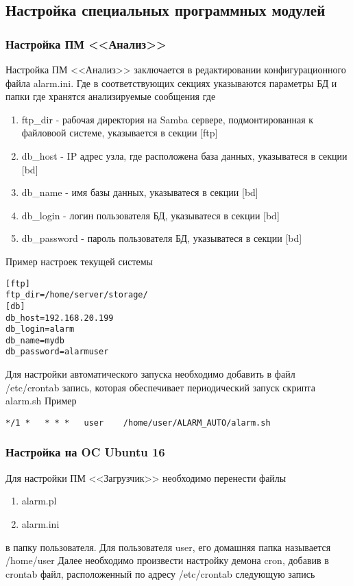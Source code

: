 ﻿\documentclass[12pt]{article}[a4paper,14pt,russian]
\begin{document}
	\subsection {Настройка специальных программных модулей}
	\subsubsection{Настройка ПМ <<Анализ>>}
	Настройка ПМ <<Анализ>> заключается в редактировании конфигурационного файла alarm.ini. Где в соответствующих секциях указываются параметры БД и папки где хранятся анализируемые сообщения 
	где
	\begin{enumerate}
		\item ftp\_dir - рабочая директория на Samba сервере, подмонтированная
		 к файловоой системе, указывается в секции [ftp]
		 \item db\_host - IP адрес узла, где расположена база данных, указыватеся в секции [bd]
		 \item db\_name - имя базы данных, указыватеся в секции [bd]
		 \item db\_login - логин пользователя БД, указыватеся в секции [bd]
		 \item db\_password - пароль пользователя БД, указыватеся в секции [bd]
	\end{enumerate}
	
	Пример настроек текущей системы
\begin{verbatim} 
[ftp]
ftp_dir=/home/server/storage/
[db]
db_host=192.168.20.199
db_login=alarm
db_name=mydb
db_password=alarmuser
\end{verbatim}
Для настройки автоматического запуска необходимо добавить в файл /etc/crontab
запись, которая обеспечивает периодический запуск скрипта alarm.sh
Пример

\begin{verbatim}
*/1 *   * * *   user    /home/user/ALARM_AUTO/alarm.sh
\end{verbatim}

	\subsubsection{Настройка на OC Ubuntu 16}
	Для настройки ПМ <<Загрузчик>> необходимо перенести файлы
	\begin{enumerate}
	\item alarm.pl
	\item alarm.ini
	\end{enumerate}
	в папку пользователя. Для пользователя user, его домашняя папка называется /home/user
	Далее необходимо произвести настройку демона cron, добавив в crontab файл, расположенный по адресу 
	/etc/crontab
	следующую запись
	
\end{document}
